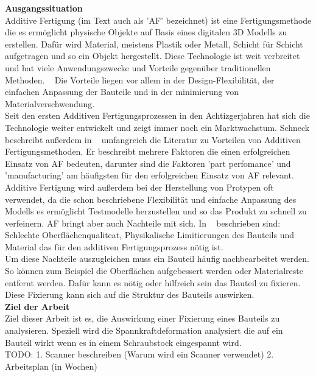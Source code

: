 \documentclass[../main.tex]{subfiles}
\begin{document}
\begin{flushleft}
    \textbf{Ausgangssituation}\\
    Additive Fertigung (im Text auch als 'AF' bezeichnet) ist eine Fertigungsmethode die es ermöglicht 
    physische Objekte auf Basis eines digitalen 3D Modells zu erstellen. 
    Dafür wird Material, meistens Plastik oder Metall, 
    Schicht für Schicht aufgetragen und so ein Objekt hergestellt.
    Diese Technologie ist weit verbreitet und hat viele Anwendungszwecke und 
    Vorteile gegenüber traditionellen Methoden. ~\cite{MEHRPOUYA202129}
    Die Vorteile liegen vor allem in der Design-Flexibilität, der einfachen Anpassung der Bauteile 
    und in der minimierung von Materialverschwendung. ~\cite{MEHRPOUYA202129}
    \\
    Seit den ersten Additiven Fertigungsprozessen in den Achtizgerjahren
    hat sich die Technologie weiter entwickelt und zeigt immer noch ein Marktwachstum.
    Schneck beschreibt außerdem in ~\cite{SCHNECK201919} umfangreich die Literatur zu Vorteilen von Additiven 
    Fertigungsmethoden. Er beschreibt mehrere Faktoren die einen erfolgreichen Einsatz von AF bedeuten, 
    darunter sind die Faktoren 'part perfomance' und 'manufacturing' am häufigsten für den erfolgreichen Einsatz von AF relevant.
    \\
    Additive Fertigung wird außerdem bei der Herstellung von Protypen oft verwendet, da die schon beschriebene Flexibilität 
    und einfache Anpassung des Modells es ermöglicht Testmodelle herzustellen und so das Produkt zu schnell zu verfeinern.
    AF bringt aber auch Nachteile mit sich. In ~\cite{Kumbhar2018} beschrieben sind: 
    Schlechte Oberflächenqualiteat, Physikalische Limitierungen des Bauteils und Material
    das für den additiven Fertigungsprozess nötig ist.
    \\
    Um diese Nachteile auszugleichen muss ein Bauteil häufig nachbearbeitet werden. So können zum Beispiel die Oberflächen 
    aufgebessert werden oder Materialreste entfernt werden.
    Dafür kann es nötig oder hilfreich sein das Bauteil zu fixieren. 
    Diese Fixierung kann sich auf die Struktur des Bauteils auswirken.\\
    \newblock
    \textbf{Ziel der Arbeit}\\
    Ziel dieser Arbeit ist es, die Auswirkung einer Fixierung eines Bauteils zu analysieren.
    Speziell wird die Spannkraftdeformation analysiert die auf ein Bauteil wirkt wenn es in einem
    Schraubstock eingespannt wird.\\

    TODO:
    1. Scanner beschreiben (Warum wird ein Scanner verwendet)
    2. Arbeitsplan (in Wochen)
    
\end{flushleft}
\end{document}

